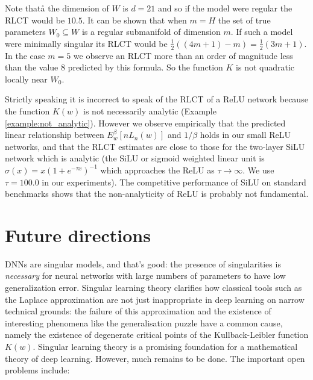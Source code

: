 \documentclass{article} %
\begin{document}
Note thatå the dimension of $W$ is $d = 21$ and so if the model were regular the RLCT would be $10.5$. It can be shown that when $m = H$ the set of true parameters $W_0 \subseteq W$ is a regular submanifold of dimension $m$. If such a model were minimally singular its RLCT would be $\tfrac{1}{2}( (4m + 1) - m ) = \tfrac{1}{2}( 3m + 1 )$. In the case $m = 5$ we observe an RLCT more than an order of magnitude less than the value $8$ predicted by this formula. So the function $K$ is not quadratic locally near $W_0$.

Strictly speaking it is incorrect to speak of the RLCT of a ReLU network because the function $K(w)$ is not necessarily analytic (Example \ref{example:not_analytic}). However we observe empirically that the predicted linear relationship between $E^\beta_w[nL_n(w)]$ and $1/\beta$ holds in our small ReLU networks, and that the RLCT estimates are close to those for the two-layer SiLU network \citep{hendrycks2016gaussian} which is analytic (the SiLU or sigmoid weighted linear unit is $\sigma(x) = x (1 + e^{-\tau x})^{-1}$ which approaches the ReLU as $\tau \to \infty$. We use $\tau = 100.0$ in our experiments). The competitive performance of SiLU on standard benchmarks \cite{ramachandran2017swish} shows that the non-analyticity of ReLU is probably not fundamental.


\section{Future directions}

DNNs are singular models, and that's good: the presence of singularities is \emph{necessary} for neural networks with large numbers of parameters to have low generalization error. Singular learning theory clarifies how classical tools such as the Laplace approximation are not just inappropriate in deep learning on narrow technical grounds: the failure of this approximation and the existence of interesting phenomena like the generalisation puzzle have a common cause, namely the existence of degenerate critical points of the Kullback-Leibler function $K(w)$. 
Singular learning theory is a promising foundation for a mathematical theory of deep learning. However, much remains to be done. The important open problems include:
\end{document}

